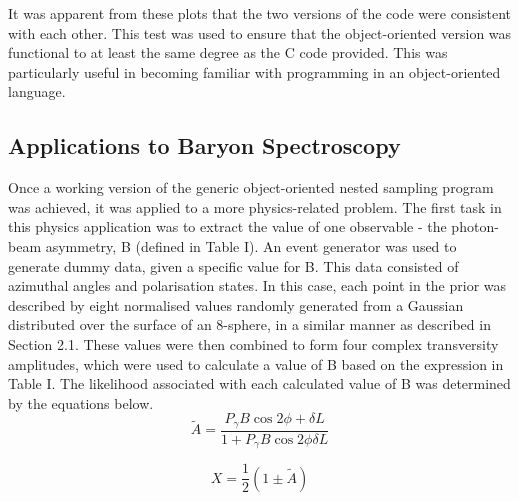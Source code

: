 \documentclass[a4paper,12pt]{article}
\begin{document}
It was apparent from these plots that the two versions of the code were consistent with each other.  This test was used to ensure that the object-oriented version was functional to at least the same degree as the C code provided.  This was particularly useful in becoming familiar with programming in an object-oriented language.

\newpage
 
\subsection{Applications to Baryon Spectroscopy}

Once a working version of the generic object-oriented nested sampling program was achieved, it was applied to a more physics-related problem.  The first task in this physics application was to extract the value of one observable - the photon-beam asymmetry, B (defined in Table I). An event generator was used to generate dummy data, given a specific value for B.  This data consisted of azimuthal angles and polarisation states.
\newline
In this case, each point in the prior was described by eight normalised values randomly generated from a Gaussian distributed over the surface of an 8-sphere, in a similar manner as described in Section 2.1. %
These values were then combined to form four complex transversity amplitudes, which were used to calculate a value of B based on the expression in Table I.  The likelihood associated with each calculated value of B was determined by the equations below.\cite{dgi}
\begin{equation}
 \tilde{A} = \frac{P_{\gamma}B\cos2\phi + \delta L}{1 + P_{\gamma}B\cos2\phi \delta L}
\end{equation}


\begin{equation}
X = \frac{1}{2}(1 \pm \tilde{A})
\end{equation}
\end{document}
